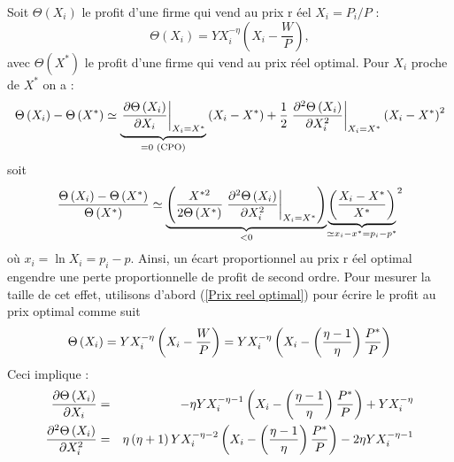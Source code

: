 \documentclass[11pt,a4paper]{article}
\begin{document}
Soit $\Theta \left( X_{i}\right) $ le profit d'une firme qui vend au prix r%
\'{e}el $X_{i}=P_{i}/P$ : 
\begin{equation*}
\Theta \left( X_{i}\right) =YX_{i}^{-\eta }\left( X_{i}-\frac{W}{P}\right) ,
\end{equation*}%
avec $\Theta \left( X^{\ast }\right) $ le profit d'une firme qui vend au
prix r\'{e}el optimal. Pour $X_{i}$ proche de $X^{\ast }$ on a :%
\begin{equation*}
\Theta \left( X_{i}\right) -\Theta \left( X^{\ast }\right) \simeq \underset{%
=0\text{ (CPO)}}{\underbrace{\left. \frac{\partial \Theta \left(
X_{i}\right) }{\partial X_{i}}\right\vert _{X_{i}=X^{\ast }}}}\left(
X_{i}-X^{\ast }\right) +\frac{1}{2}\left. \frac{\partial ^{2}\Theta \left(
X_{i}\right) }{\partial X_{i}^{2}}\right\vert _{X_{i}=X^{\ast }}\left(
X_{i}-X^{\ast }\right) ^{2}
\end{equation*}%
soit%
\begin{equation*}
\frac{\Theta \left( X_{i}\right) -\Theta \left( X^{\ast }\right) }{\Theta
\left( X^{\ast }\right) }\simeq \underset{<0}{\underbrace{\left( \frac{%
X^{\ast 2}}{2\Theta \left( X^{\ast }\right) }\left. \frac{\partial
^{2}\Theta \left( X_{i}\right) }{\partial X_{i}^{2}}\right\vert
_{X_{i}=X^{\ast }}\right) }}\underset{\simeq x_{i}-x^{\ast }=p_{i}-p^{\ast }}%
{\underbrace{\left( \frac{X_{i}-X^{\ast }}{X^{\ast }}\right) }}^{2}
\end{equation*}%
o\`{u} $x_{i}=\ln X_{i}=p_{i}-p$. Ainsi, un \'{e}cart proportionnel au prix r%
\'{e}el optimal engendre une perte proportionnelle de profit de second
ordre. Pour mesurer la taille de cet effet, utilisons d'abord (\ref{Prix
reel optimal}) pour \'{e}crire le profit au prix optimal comme suit 
\begin{equation*}
\Theta \left( X_{i}\right) =YX_{i}^{-\eta }\left( X_{i}-\frac{W}{P}\right)
=YX_{i}^{-\eta }\left( X_{i}-\left( \frac{\eta -1}{\eta }\right) \frac{%
P^{\ast }}{P}\right)
\end{equation*}%
Ceci implique :%
\begin{eqnarray*}
\frac{\partial \Theta \left( X_{i}\right) }{\partial X_{i}} &=&-\eta
YX_{i}^{-\eta -1}\left( X_{i}-\left( \frac{\eta -1}{\eta }\right) \frac{%
P^{\ast }}{P}\right) +YX_{i}^{-\eta } \\
\frac{\partial ^{2}\Theta \left( X_{i}\right) }{\partial X_{i}^{2}} &=&\eta
\left( \eta +1\right) YX_{i}^{-\eta -2}\left( X_{i}-\left( \frac{\eta -1}{%
\eta }\right) \frac{P^{\ast }}{P}\right) -2\eta YX_{i}^{-\eta -1}
\end{eqnarray*}%
\end{document}
